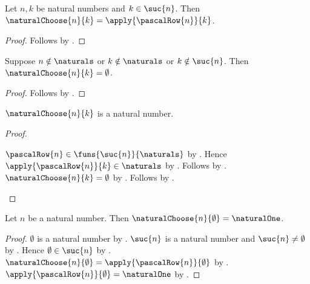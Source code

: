 \begin{proposition}\label{natural_choose_in_range}
    Let $n,k$ be natural numbers and $k\in\suc{n}$.
    Then $\naturalChoose{n}{k}=\apply{\pascalRow{n}}{k}$.
\end{proposition}
\begin{proof}
    Follows by .
\end{proof}

\begin{proposition}\label{natural_choose_off_domain}
    Suppose $n\notin\naturals$ or $k\notin\naturals$ or
        $k\notin\suc{n}$.
    Then $\naturalChoose{n}{k}=\emptyset$.
\end{proposition}
\begin{proof}
    Follows by .
\end{proof}

\begin{proposition}\label{natural_choose_type}
    $\naturalChoose{n}{k}$ is a natural number.
\end{proposition}
\begin{proof}
    \begin{byCase}
            $\pascalRow{n}\in\funs{\suc{n}}{\naturals}$ by
                .
            Hence $\apply{\pascalRow{n}}{k}\in\naturals$ by
                .
            Follows by .
            $\naturalChoose{n}{k}=\emptyset$ by
                .
            Follows by .
    \end{byCase}
\end{proof}

\begin{proposition}\label{natural_choose_first}
    Let $n$ be a natural number.
    Then $\naturalChoose{n}{\emptyset}=\naturalOne$.
\end{proposition}
\begin{proof}
    $\emptyset$ is a natural number by .
    $\suc{n}$ is a natural number and $\suc{n}\neq\emptyset$ by
        .
    Hence $\emptyset\in\suc{n}$ by
        .
    $\naturalChoose{n}{\emptyset}
        =\apply{\pascalRow{n}}{\emptyset}$ by
        .
    $\apply{\pascalRow{n}}{\emptyset}=\naturalOne$ by
        .
\end{proof}

